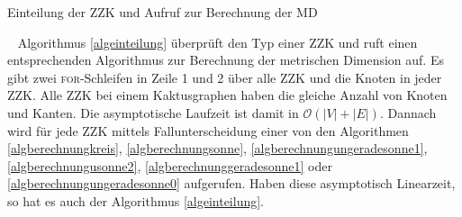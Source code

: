 \begin{algorithm}
\caption{Einteilung der ZZK und Aufruf zur Berechnung der MD}
\begin{algorithmic}[1]
\vspace{2mm}
\FORALL{($x \in ZZK$%
)}{
\FORALL{($v \in x$)}{ 
\STATE Erhöhe $K[x]$ um eins für jeden Knoten $v$ mit $Klasse[v]=0$ oder $Klasse[v]=A$;
\STATE Erhöhe $S[x]$ um eins für jeden Knoten $v$ mit $Klasse[v]\neq 0$;
\STATE Erhöhe $Anker[x]$ um eins für jeden Knoten $v$ mit $Klasse[v]=A$;
}\ENDFOR
\IF{($x.Knoten==S[x]$)}{\STATE $S(x)$;}\ELSIF{($x.Knoten==K[x]$)}{\STATE $K(x)$;}\ELSE{\IF{($Anker[x] \leq 2$ oder $Anker[x] \geq \frac{n-3}{2}$)}{
		\IF{($(n\; \textbf{mod} \; 2)==1$ oder $n==4$)}
		{		 \STATE $USU(x)$;
			}
		\ELSIF{($(n\; \textbf{mod} \; 2)==0$)}{
		\IF{($Anker[x]==0$)}{\STATE $USG0(x)$;}
			\ELSE{\STATE $USG1(x)$;}
			\ENDIF
		}\ENDIF}
	\ELSE{\STATE $US(x)$;
	}\ENDIF}\ENDIF
}\ENDFOR
\vspace{2mm}
\end{algorithmic}
\label{algeinteilung}
\end{algorithm}
\vspace{-2mm}
~\linebreak
Algorithmus \ref{algeinteilung} überprüft den Typ einer ZZK und ruft einen entsprechenden Algorithmus zur Berechnung der metrischen Dimension auf. Es gibt zwei \textsc{for}-Schleifen in Zeile 1 und 2 über alle ZZK und die Knoten in jeder ZZK. Alle ZZK bei einem Kaktusgraphen haben die gleiche Anzahl von Knoten und Kanten. Die asymptotische Laufzeit ist damit in $\mathcal{O}(|V|+|E|)$. Dannach wird für jede ZZK mittels Fallunterscheidung einer von den Algorithmen \ref{algberechnungkreis}, \ref{algberechnungsonne}, \ref{algberechnungungeradesonne1}, \ref{algberechnungusonne2}, \ref{algberechnunggeradesonne1} oder \ref{algberechnungungeradesonne0} aufgerufen. Haben diese asymptotisch Linearzeit, so hat es auch der Algorithmus \ref{algeinteilung}.
\newpage

